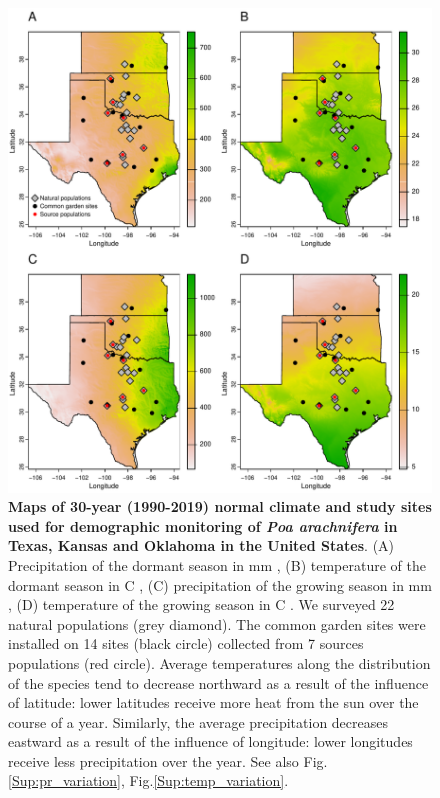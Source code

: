 \documentclass[12pt]{article}
\begin{document}
\begin{figure}[H]
  \begin{center}
    \includegraphics[width=0.90\linewidth]{Figures/POAR_survey_garden_map.pdf}
  \caption{\textbf{Maps of 30-year (1990-2019) normal climate and study sites used for demographic monitoring of \emph{Poa arachnifera} in Texas, Kansas and Oklahoma in the United States}.
  (A) Precipitation of the dormant season in mm , (B) temperature of the dormant season in \degree C , (C) precipitation of the growing season in mm , (D) temperature of the growing season in \degree C . 
  We surveyed 22 natural populations (grey diamond).
  The common garden sites were installed on 14 sites (black circle) collected from 7 sources populations (red circle). 
  Average temperatures along the distribution of the species tend to decrease northward as a result of the influence of latitude: lower latitudes receive more heat from the sun over the course of a year. 
  Similarly, the average precipitation decreases eastward as a result of the influence of longitude:  lower longitudes receive less precipitation over the year.
  See also Fig.\ref{Sup:pr_variation}, Fig.\ref{Sup:temp_variation}.}
  \label{fig:study_design}
  \end{center}
\end{figure}
\end{document}
